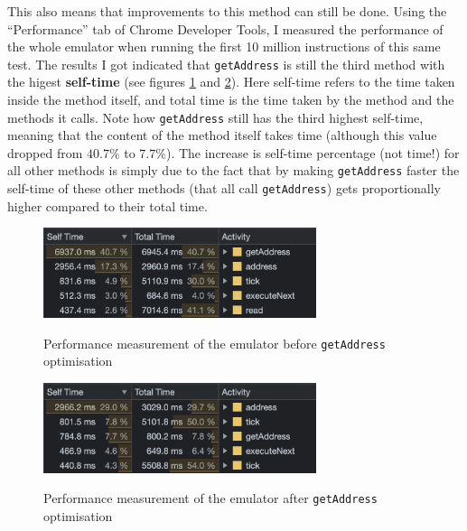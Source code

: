 \documentclass[11pt]{report}
\begin{document}
This also means that improvements to this method can still be done. Using the ``Performance'' tab of Chrome Developer Tools, I measured the performance of the whole emulator when running the first 10 million instructions of this same test. The results I got indicated that \texttt{getAddress} is still the third method with the higest \textbf{self-time} (see figures \ref{fig:performance-getaddress-before} and \ref{fig:performance-getaddress-after}). Here self-time refers to the time taken inside the method itself, and total time is the time taken by the method and the methods it calls. Note how \texttt{getAddress} still has the third highest self-time, meaning that the content of the method itself takes time (although this value dropped from $40.7\%$ to $7.7\%$). The increase is self-time percentage (not time!) for all other methods is simply due to the fact that by making \texttt{getAddress} faster the self-time of these other methods (that all call \texttt{getAddress}) gets proportionally higher compared to their total time.

\begin{figure}[h]
    \centering
    \includegraphics[width=8cm]{images/get-address-before}\\
    \caption{Performance measurement of the emulator before \texttt{getAddress} optimisation}
    \label{fig:performance-getaddress-before}
\end{figure}

\begin{figure}[h]
    \centering
    \includegraphics[width=8cm]{images/get-address-after}\\
    \caption{Performance measurement of the emulator after \texttt{getAddress} optimisation}
    \label{fig:performance-getaddress-after}
\end{figure}
\end{document}
